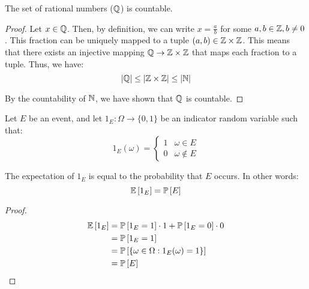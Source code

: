 \documentclass[name=Jacob\ Strieb, andrewid=jstrieb, course=69-420, num=4]{homework}
\begin{document}
    

\begin{claim}
    The set of rational numbers ($\mathbb{Q}$) is countable.
\end{claim}
\begin{proof}
    Let $x \in \mathbb{Q}$. Then, by definition, we can write $x = \frac{a}{b}$ for some $a, b \in \mathbb{Z}, b \neq 0$. This fraction can be uniquely mapped to a tuple $(a, b) \in \mathbb{Z} \times \mathbb{Z}$. This means that there exists an injective mapping $\mathbb{Q} \to \mathbb{Z} \times \mathbb{Z}$ that maps each fraction to a tuple. Thus, we have:
    $$ |\mathbb{Q}| \leq |\mathbb{Z} \times \mathbb{Z}| \leq |\mathbb{N}| $$
    
    By the countability of $\mathbb{N}$, we have shown that $\mathbb{Q}$ is countable.
\end{proof}

\separator

Let $E$ be an event, and let $1_E : \Omega \to \{ 0, 1 \}$ be an indicator random variable such that:
$$ 1_E(\omega) = \begin{cases}
1 & \omega \in E \\
0 & \omega \notin E
\end{cases} $$

\begin{claim}
    The expectation of $1_E$ is equal to the probability that $E$ occurs. In other words:
    $$ \mathbb{E}\left[ 1_E \right] = \mathbb{P}\left[ E \right] $$
\end{claim}
\begin{proof}
    \begin{align*}
    \mathbb{E}\left[ 1_E \right] &= \mathbb{P}\left[ 1_E = 1 \right] \cdot 1 + \mathbb{P}\left[ 1_E = 0 \right] \cdot 0 \\
    &= \mathbb{P}\left[ 1_E = 1 \right] \\
    &= \mathbb{P}\left[  \{ \omega \in \Omega : 1_E(\omega) = 1 \}  \right] \\
    &= \mathbb{P}\left[ E \right]
    \end{align*}
\end{proof}
\newpage

\end{document}
